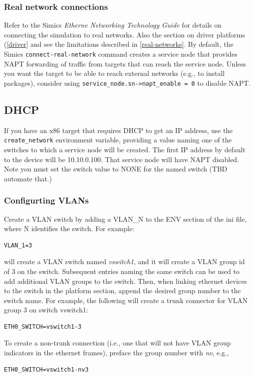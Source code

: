 \documentclass[titlepage]{article}
\begin{document}
\subsubsection{Real network connections}
Refer to the Simics \textit{Etherne Networking Technology Guide} for details on connecting the simulation to real networks.
Also the section on driver platforms (\ref{driver} and see the limitations described in \ref{real-networks}.  By default, the Simics {\tt connect-real-network} command creates a service
node that provides NAPT forwarding of traffic from targets that can reach the service node.  Unless you want the target to be able to
reach external networks (e.g., to install packages), consider using {\tt service\_node.sn->napt\_enable = 0} to disable NAPT.

\subsection{DHCP}
If you have an x86 target that requires DHCP to get an IP address, use the {\tt create\_network} environment variable, providing a value
naming one of the switches to which a service node will be created.  The first IP address by default to the device will be 10.10.0.100.
That service node will have NAPT disabled.  Note you must set the switch value to NONE for the named switch (TBD automate that.)

\subsubsection{Configurting VLANs}
Create a VLAN switch by adding a {VLAN\_N} to the ENV section of the ini file, where N identifies the switch.  For example:
\begin{verbatim}
VLAN_1=3
\end{verbatim}
\noindent will create a VLAN switch named \textit{vswitch1}, and it will create a VLAN group id of 3 on the switch.  Subsequent entries naming the same switch
can be used to add additional VLAN groups to the switch.  Then, when linking ethernet devices to the switch in the platform section, append the desired group 
number to the switch name.  For example, the following will create a trunk connector for VLAN group 3 on switch vswitch1:
\begin{verbatim}
ETH0_SWITCH=vswitch1-3
\end{verbatim}
\noindent To create a non-trunk connection (i.e., one that will not have VLAN group indicators in the ethernet frames), preface the group number with 
\textit{nv}, e.g.,
\begin{verbatim}
ETH0_SWITCH=vswitch1-nv3
\end{verbatim}
\end{document}
